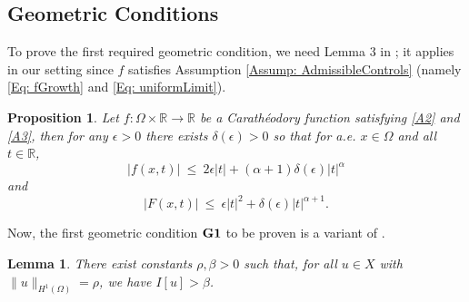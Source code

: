 \documentclass[11pt]{amsart}   	%
\theoremstyle{plain}
\numberwithin{equation}{section}
\newtheorem{lemma}[thm]{Lemma}
\newtheorem{proposition}[thm]{Proposition}
\def\al{\alpha}
\def\be{\beta}
\def\de{\delta}
\def\ep{\epsilon}
\def\Om{\Omega}
\def\R{\mathbb{R}}
\def\grad{\nabla}
\newcommand{\JMS}[1]{{\color{orange} {\bf J. Siktar:} [#1] }}
\begin{document}


\subsection{Geometric Conditions}

To prove the first required geometric condition, we need Lemma 3 in \cite{servadei2012mountain}; it applies in our setting  since $f$ satisfies Assumption \ref{Assump: AdmissibleControls} (namely \eqref{Eq: fGrowth} and \eqref{Eq: uniformLimit}).
\begin{proposition}\label{Prop: fB}
    Let $f: \Om \times \R \rightarrow \R$ be a Carathéodory function satisfying \ref{A2} and \ref{A3}, then for any $\ep > 0$ there exists $\de(\ep) > 0$ so that for a.e. $x \in \Om$ and all $t \in \R$,
    \begin{equation}\label{Eq: fB}
        |f(x, t)| \ \leq \ 2\ep|t| + (\al + 1)\de(\ep)|t|^{\al}
    \end{equation}
        and
    \begin{equation}\label{Eq: FB}
        |F(x, t)| \ \leq \ \ep|t|^2 + \de(\ep)|t|^{\al + 1}.
    \end{equation}
    \end{proposition}

Now, the first geometric condition ${\bf G1}$ to be proven is a variant of \cite[Proposition 9]{servadei2012mountain}.
\begin{lemma}\label{Lem: theRingLemma}
    There exist constants $\rho, \be > 0$ such that, for all $u \in X$ with 
    $\| u\|_{H^1(\Omega)} = \rho$,
    we have $I[u] > \be$.
\end{lemma}
\end{document}
